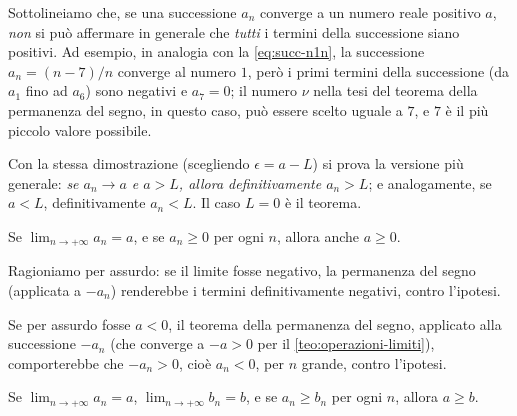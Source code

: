 Sottolineiamo che, se una successione $a_{n}$ converge a un numero reale positivo $a$,
\emph{non} si può affermare in generale che \emph{tutti} i termini della successione
siano positivi. Ad esempio, in analogia con la \eqref{eq:succ-n1n}, la successione
$a_{n}=(n-7)/n$ converge al numero $1$, però i primi termini della successione (da $a_{1}$
fino ad $a_{6}$) sono negativi e $a_{7}=0$; il numero $\nu$ nella tesi del teorema della
permanenza del segno, in questo caso, può essere scelto uguale a $7$, e $7$ è il più
piccolo valore possibile.

\begin{osservazione}
Con la stessa dimostrazione (scegliendo $\epsilon=a-L$) si prova la versione più
generale: \emph{se $a_{n}\to a$ e $a>L$, allora definitivamente $a_{n}>L$}; e
analogamente, se $a<L$, definitivamente $a_{n}<L$. Il caso $L=0$ è il teorema.
\end{osservazione}

\begin{corollario}\label{cor:limite-non-negativo}
Se $\displaystyle\lim_{n\to+\infty}a_{n}=a$, e se $a_{n}\ge0$ per ogni $n$, allora anche
$a\ge0$.
\end{corollario}

\begin{schema}
\end{schema}

\begin{strategia}
Ragioniamo per assurdo: se il limite fosse negativo, la permanenza del segno (applicata
a $-a_{n}$) renderebbe i termini definitivamente negativi, contro l'ipotesi.
\end{strategia}

\begin{dimostrazione}
Se per assurdo fosse $a<0$, il teorema della permanenza del segno, applicato alla
successione $-a_{n}$ (che converge a $-a>0$ per il \cref{teo:operazioni-limiti}),
comporterebbe che $-a_{n}>0$, cioè $a_{n}<0$, per $n$ grande, contro l'ipotesi.
\end{dimostrazione}

\begin{corollario}\label{cor:confronto-limiti}
Se $\displaystyle\lim_{n\to+\infty}a_{n}=a$, $\displaystyle\lim_{n\to+\infty}b_{n}=b$, e
se $a_{n}\ge b_{n}$ per ogni $n$, allora $a\ge b$.
\end{corollario}

\begin{schema}
\end{schema}

